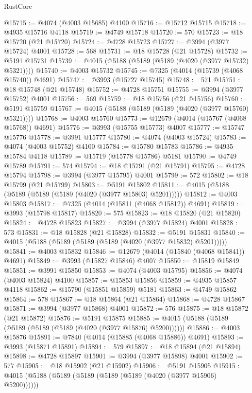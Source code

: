 \begin{lexlean}{RustCore}
\begin{coremodule}
@15715 := @4074 (@4003 @15685) @4100
@15716 := @15712 @15715
@15718 := @4935 @15716 @4118
@15719 := @4749 @15718
@15720 := 570
@15723 := @18 @15720 (@21 @15720)
@15724 := @4728 @15723
@15727 := @3994 (@3977 @15724) @4001
@15728 := 568
@15731 := @18 @15728 (@21 @15728)
@15732 := @5191 @15731
@15739 := @4015 (@5188 (@5189 (@5189 (@4020 (@3977 @15732) @5321))))
@15740 := @4003 @15732
@15745 := @7325 (@4014 (@15739 (@4068 @15740)) @4691)
@15747 := @3993 (@15727 @15745)
@15748 := 571
@15751 := @18 @15748 (@21 @15748)
@15752 := @4728 @15751
@15755 := @3994 (@3977 @15752) @4001
@15756 := 569
@15759 := @18 @15756 (@21 @15756)
@15760 := @5191 @15759
@15767 := @4015 (@5188 (@5189 (@5189 (@4020 (@3977 @15760) @5321))))
@15768 := @4003 @15760
@15773 := @12679 (@4014 (@15767 (@4068 @15768)) @4691)
@15776 := @3993 (@15755 @15773) @4007
@15777 := @15747 @15776
@15778 := @3991 @15777
@15780 := @4074 (@4003 @15724)
@15783 := @4074 (@4003 @15752) @4100
@15784 := @15780 @15783
@15786 := @4935 @15784 @4118
@15789 := @15719 (@15778 @15786) @5181
@15790 := @4749 @15789
@15791 := 574
@15794 := @18 @15791 (@21 @15791)
@15795 := @4728 @15794
@15798 := @3994 (@3977 @15795) @4001
@15799 := 572
@15802 := @18 @15799 (@21 @15799)
@15803 := @5191 @15802
@15811 := @4015 (@5188 (@5189 (@5189 (@5189 (@4020 (@3977 @15803) @5201)))))
@15812 := @4003 @15803
@15817 := @7325 (@4014 (@15811 (@4068 @15812)) @4691)
@15819 := @3993 (@15798 @15817)
@15820 := 575
@15823 := @18 @15820 (@21 @15820)
@15824 := @4728 @15823
@15827 := @3994 (@3977 @15824) @4001
@15828 := 573
@15831 := @18 @15828 (@21 @15828)
@15832 := @5191 @15831
@15840 := @4015 (@5188 (@5189 (@5189 (@5189 (@4020 (@3977 @15832) @5201)))))
@15841 := @4003 @15832
@15846 := @12679 (@4014 (@15840 (@4068 @15841)) @4691)
@15849 := @3993 (@15827 @15846) @4007
@15850 := @15819 @15849
@15851 := @3991 @15850
@15853 := @4074 (@4003 @15795)
@15856 := @4074 (@4003 @15824) @4100
@15857 := @15853 @15856
@15859 := @4935 @15857 @4118
@15862 := @15790 (@15851 @15859) @5181
@15863 := @4749 @15862
@15864 := 578
@15867 := @18 @15864 (@21 @15864)
@15868 := @4728 @15867
@15871 := @3994 (@3977 @15868) @4001
@15872 := 576
@15875 := @18 @15872 (@21 @15872)
@15876 := @5191 @15875
@15885 := @4015 (@5188 (@5189 (@5189 (@5189 (@5189 (@4020 (@3977 @15876) @5200))))))
@15886 := @4003 @15876
@15891 := @7840 (@4014 (@15885 (@4068 @15886)) @4691)
@15893 := @3993 (@15871 @15891)
@15894 := 579
@15897 := @18 @15894 (@21 @15894)
@15898 := @4728 @15897
@15901 := @3994 (@3977 @15898) @4001
@15902 := 577
@15905 := @18 @15902 (@21 @15902)
@15906 := @5191 @15905
@15915 := @4015 (@5188 (@5189 (@5189 (@5189 (@5189 (@4020 (@3977 @15906) @5200))))))

\end{coremodule}
\end{lexlean}
